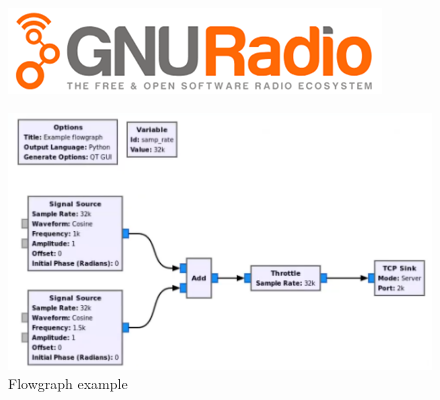 \begin{frame}
\begin{columns}
        \begin{column}{0.5\textwidth}
            \begin{figure}[t]
                \centering
                \includegraphics[width=\linewidth]{img/GNU_radio_logo.png}
                \label{fig:gnu_radio_logo}
            \end{figure}
            \begin{figure}
                \centering
                \includegraphics[width=\linewidth]{img/flowgraph example.png}
                 \caption{Flowgraph example}
                \label{fig:enter-label}
            \end{figure}
        \end{column}
    \end{columns}
	
\end{frame}



